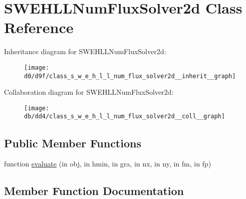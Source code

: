 \hypertarget{class_s_w_e_h_l_l_num_flux_solver2d}{}\section{S\+W\+E\+H\+L\+L\+Num\+Flux\+Solver2d Class Reference}
\label{class_s_w_e_h_l_l_num_flux_solver2d}


Inheritance diagram for S\+W\+E\+H\+L\+L\+Num\+Flux\+Solver2d\+:
\nopagebreak
\begin{figure}[H]
\begin{center}
\leavevmode
\texttt{[image: d0/d9f/class\_s\_w\_e\_h\_l\_l\_num\_flux\_solver2d\_\_inherit\_\_graph]}
\end{center}
\end{figure}


Collaboration diagram for S\+W\+E\+H\+L\+L\+Num\+Flux\+Solver2d\+:
\nopagebreak
\begin{figure}[H]
\begin{center}
\leavevmode
\texttt{[image: db/dd4/class\_s\_w\_e\_h\_l\_l\_num\_flux\_solver2d\_\_coll\_\_graph]}
\end{center}
\end{figure}
\subsection*{Public Member Functions}
\begin{DoxyCompactItemize}
\item 
function \hyperlink{class_s_w_e_h_l_l_num_flux_solver2d_a3286bea6725611b844f18045e567ea0d}{evaluate} (in obj, in hmin, in gra, in nx, in ny, in fm, in fp)
\end{DoxyCompactItemize}


\subsection{Member Function Documentation}
\mbox{\label{class_s_w_e_h_l_l_num_flux_solver2d_a3286bea6725611b844f18045e567ea0d}} 
